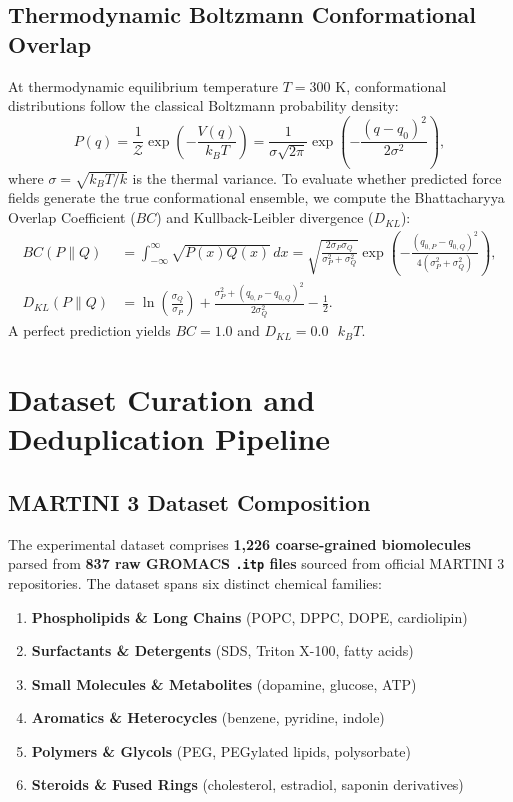 \documentclass[11pt,a4paper]{article}
\begin{document}
\subsection{Thermodynamic Boltzmann Conformational Overlap}
At thermodynamic equilibrium temperature $T = 300\text{ K}$, conformational distributions follow the classical Boltzmann probability density:
\begin{equation}
P(q) = \frac{1}{\mathcal{Z}} \exp\left(-\frac{V(q)}{k_B T}\right) = \frac{1}{\sigma \sqrt{2\pi}} \exp\left(-\frac{(q - q_0)^2}{2\sigma^2}\right),
\end{equation}
where $\sigma = \sqrt{k_B T / k}$ is the thermal variance. To evaluate whether predicted force fields generate the true conformational ensemble, we compute the Bhattacharyya Overlap Coefficient ($BC$) and Kullback-Leibler divergence ($D_{KL}$):
\begin{align}
BC(P \parallel Q) &= \int_{-\infty}^{\infty} \sqrt{P(x) Q(x)} \, dx = \sqrt{\frac{2\sigma_P \sigma_Q}{\sigma_P^2 + \sigma_Q^2}} \exp\left(-\frac{(q_{0, P} - q_{0, Q})^2}{4(\sigma_P^2 + \sigma_Q^2)}\right), \label{eq:bhattacharyya}\\
D_{KL}(P \parallel Q) &= \ln\left(\frac{\sigma_Q}{\sigma_P}\right) + \frac{\sigma_P^2 + (q_{0, P} - q_{0, Q})^2}{2\sigma_Q^2} - \frac{1}{2}. \label{eq:kldiv}
\end{align}
A perfect prediction yields $BC = 1.0$ and $D_{KL} = 0.0\text{ }k_B T$.

\section{Dataset Curation and Deduplication Pipeline}
\label{sec:dataset}

\subsection{MARTINI 3 Dataset Composition}
The experimental dataset comprises \textbf{1,226 coarse-grained biomolecules} parsed from \textbf{837 raw GROMACS \texttt{.itp} files} sourced from official MARTINI 3 repositories. The dataset spans six distinct chemical families:
\begin{enumerate}
    \item \textbf{Phospholipids \& Long Chains} (POPC, DPPC, DOPE, cardiolipin)
    \item \textbf{Surfactants \& Detergents} (SDS, Triton X-100, fatty acids)
    \item \textbf{Small Molecules \& Metabolites} (dopamine, glucose, ATP)
    \item \textbf{Aromatics \& Heterocycles} (benzene, pyridine, indole)
    \item \textbf{Polymers \& Glycols} (PEG, PEGylated lipids, polysorbate)
    \item \textbf{Steroids \& Fused Rings} (cholesterol, estradiol, saponin derivatives)
\end{enumerate}
\end{document}
